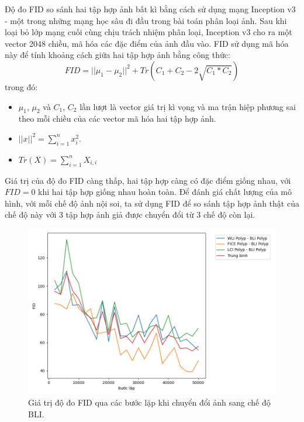 \documentclass[12pt]{extreport}
\begin{document}
Độ đo FID so sánh hai tập hợp ảnh bất kì bằng cách sử dụng mạng Inception v3 - một trong những mạng học sâu đi đầu trong bài toán phân loại ảnh. Sau khi loại bỏ lớp mạng cuối cùng chịu trách nhiệm phân loại, Inception v3 cho ra một vector 2048 chiều, mã hóa các đặc điểm của ảnh đầu vào. FID sử dụng mã hóa này để tính khoảng cách giữa hai tập hợp ảnh bằng công thức:
$$ FID = ||\mu_1 - \mu_2||^2 + Tr(C_1 + C_2 - 2\sqrt{C_1 * C_2}) $$
trong đó:
\begin{itemize}
    \item $ \mu_1 $, $ \mu_2 $ và $ C_1 $, $ C_2 $ lần lượt là vector giá trị kì vọng và ma trận hiệp phương sai theo mỗi chiều của các vector mã hóa hai tập hợp ảnh.
    \item $ ||x||^2 = \sum_{i=1}^{n} x_i^2 $.
    \item $ Tr(X) = \sum_{i=1}^{n} X_{i,i} $
\end{itemize}

Giá trị của độ đo FID càng thấp, hai tập hợp càng có đặc điểm giống nhau, với $ FID = 0 $ khi hai tập hợp giống nhau hoàn toàn. Để đánh giá chất lượng của mô hình, với mỗi chế độ ảnh nội soi, ta sử dụng FID để so sánh tập hợp ảnh thật của chế độ này với 3 tập hợp ảnh giả được chuyển đổi từ 3 chế độ còn lại.

\begin{figure}[H]
    \centering
    \includegraphics[width=\linewidth]{fid/FID_BLI.png}
    \caption{Giá trị độ đo FID qua các bước lặp khi chuyển đổi ảnh sang chế độ BLI.}
\end{figure}
\end{document}
